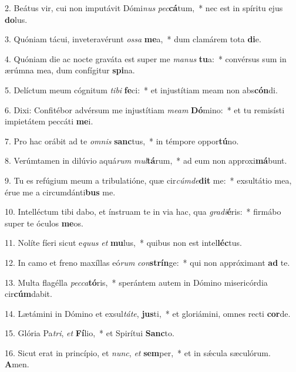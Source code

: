 2. Beátus vir, cui non imputávit Dómi\textit{nus} \textit{pec}\textbf{cá}tum,~*  nec est in spíritu ejus \textbf{do}lus.\

3. Quóniam tácui, inveteravérunt \textit{os}\textit{sa} \textbf{me}a,~*  dum clamárem tota \textbf{di}e.\

4. Quóniam die ac nocte graváta est super me \textit{ma}\textit{nus} \textbf{tu}a:~*  convérsus sum in ærúmna mea, dum confígitur \textbf{spi}na.\

5. Delíctum meum cógnitum \textit{ti}\textit{bi} \textbf{fe}ci:~*  et injustítiam meam non abs\textbf{cón}di.\

6. Dixi: Confitébor advérsum me injustítiam \textit{me}\textit{am} \textbf{Dó}mino:~*  et tu remisísti impietátem peccáti \textbf{me}i.\

7. Pro hac orábit ad te \textit{om}\textit{nis} \textbf{sanc}tus,~*  in témpore oppor\textbf{tú}no.\

8. Verúmtamen in dilúvio aquá\textit{rum} \textit{mul}\textbf{tá}rum,~*  ad eum non approxi\textbf{má}bunt.\

9. Tu es refúgium meum a tribulatióne, quæ cir\textit{cúm}\textit{de}\textbf{dit} me:~*  exsultátio mea, érue me a circumdánti\textbf{bus} me.\

10. Intelléctum tibi dabo, et ínstruam te in via hac, qua \textit{gra}\textit{di}\textbf{é}ris:~*  firmábo super te óculos \textbf{me}os.\

11. Nolíte fíeri sicut e\textit{quus} \textit{et} \textbf{mu}lus,~*  quibus non est intel\textbf{léc}tus.\

12. In camo et freno maxíllas eó\textit{rum} \textit{con}\textbf{strín}ge:~*  qui non appróximant \textbf{ad} te.\

13. Multa flagélla \textit{pec}\textit{ca}\textbf{tó}ris,~*  sperántem autem in Dómino misericórdia cir\textbf{cúm}dabit.\

14. Lætámini in Dómino et exsul\textit{tá}\textit{te}, \textbf{jus}ti,~*  et gloriámini, omnes recti \textbf{cor}de.\

15. Glória Pa\textit{tri}, \textit{et} \textbf{Fí}lio,~*  et Spirítui \textbf{Sanc}to.\

16. Sicut erat in princípio, et \textit{nunc}, \textit{et} \textbf{sem}per,~*  et in sǽcula sæculórum. \textbf{A}men.\

